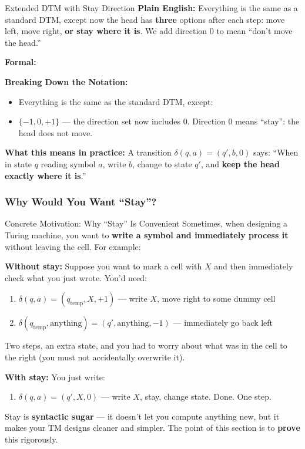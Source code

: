 \begin{definitionbox}{Extended DTM with Stay Direction \kemark}
\textbf{Plain English:} Everything is the same as a standard DTM, except now the head has \textbf{three} options after each step: move left, move right, \textbf{or stay where it is}. We add direction $0$ to mean ``don't move the head.''

\textbf{Formal:}

\textbf{Breaking Down the Notation:}
\begin{itemize}[nosep]
\item Everything is the same as the standard DTM, except:
\item $\{-1, 0, +1\}$ --- the direction set now includes $0$. Direction $0$ means ``stay'': the head does not move.
\end{itemize}

\textbf{What this means in practice:} A transition $\delta(q, a) = (q', b, 0)$ says: ``When in state $q$ reading symbol $a$, write $b$, change to state $q'$, and \textbf{keep the head exactly where it is}.''
\end{definitionbox}

\subsubsection{Why Would You Want ``Stay''?}

\begin{notebox}{Concrete Motivation: Why ``Stay'' Is Convenient}
Sometimes, when designing a Turing machine, you want to \textbf{write a symbol and immediately process it} without leaving the cell. For example:

\textbf{Without stay:} Suppose you want to mark a cell with $X$ and then immediately check what you just wrote. You'd need:
\begin{enumerate}[nosep]
\item $\delta(q, a) = (q_{\text{temp}}, X, +1)$ --- write $X$, move right to some dummy cell
\item $\delta(q_{\text{temp}}, \text{anything}) = (q', \text{anything}, -1)$ --- immediately go back left
\end{enumerate}
Two steps, an extra state, and you had to worry about what was in the cell to the right (you must not accidentally overwrite it).

\textbf{With stay:} You just write:
\begin{enumerate}[nosep]
\item $\delta(q, a) = (q', X, 0)$ --- write $X$, stay, change state. Done. One step.
\end{enumerate}

Stay is \textbf{syntactic sugar} --- it doesn't let you compute anything new, but it makes your TM designs cleaner and simpler. The point of this section is to \textbf{prove} this rigorously.
\end{notebox}

